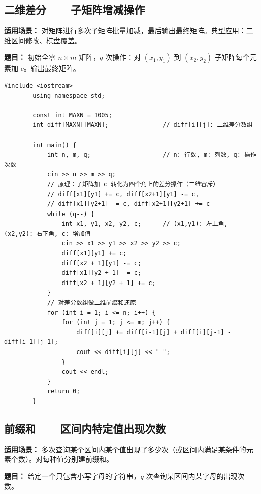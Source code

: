 \documentclass[12pt,a4paper]{ctexart}
\begin{document}
	\subsection{二维差分——子矩阵增减操作}
	\textbf{适用场景：} 对矩阵进行多次子矩阵批量加减，最后输出最终矩阵。典型应用：二维区间修改、棋盘覆盖。
	
	\textbf{题目：} 初始全零 $n\times m$ 矩阵，$q$ 次操作：对 $(x_1,y_1)$ 到 $(x_2,y_2)$ 子矩阵每个元素加 $c$。输出最终矩阵。
	
	\begin{lstlisting}[caption={二维差分——O(1) 子矩阵增减}]
		#include <iostream>
		using namespace std;
		
		const int MAXN = 1005;
		int diff[MAXN][MAXN];               // diff[i][j]: 二维差分数组
		
		int main() {
			int n, m, q;                    // n: 行数, m: 列数, q: 操作次数
			cin >> n >> m >> q;
			// 原理：子矩阵加 c 转化为四个角上的差分操作（二维容斥）
			// diff[x1][y1] += c, diff[x2+1][y1] -= c,
			// diff[x1][y2+1] -= c, diff[x2+1][y2+1] += c
			while (q--) {
				int x1, y1, x2, y2, c;      // (x1,y1): 左上角, (x2,y2): 右下角, c: 增加值
				cin >> x1 >> y1 >> x2 >> y2 >> c;
				diff[x1][y1] += c;
				diff[x2 + 1][y1] -= c;
				diff[x1][y2 + 1] -= c;
				diff[x2 + 1][y2 + 1] += c;
			}
			// 对差分数组做二维前缀和还原
			for (int i = 1; i <= n; i++) {
				for (int j = 1; j <= m; j++) {
					diff[i][j] += diff[i-1][j] + diff[i][j-1] - diff[i-1][j-1];
					cout << diff[i][j] << " ";
				}
				cout << endl;
			}
			return 0;
		}
	\end{lstlisting}
	
	\subsection{前缀和——区间内特定值出现次数}
	\textbf{适用场景：} 多次查询某个区间内某个值出现了多少次（或区间内满足某条件的元素个数）。对每种值分别建前缀和。
	
	\textbf{题目：} 给定一个只包含小写字母的字符串，$q$ 次查询某区间内某字母的出现次数。
	
\end{document}
